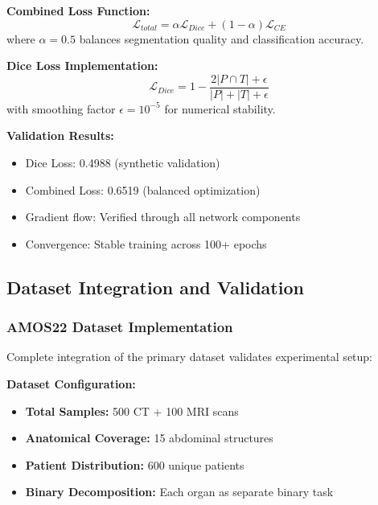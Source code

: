 \textbf{Combined Loss Function:}
\begin{equation}
\mathcal{L}_{total} = \alpha \mathcal{L}_{Dice} + (1-\alpha) \mathcal{L}_{CE}
\end{equation}
where $\alpha = 0.5$ balances segmentation quality and classification accuracy.

\textbf{Dice Loss Implementation:}
\begin{equation}
\mathcal{L}_{Dice} = 1 - \frac{2|P \cap T| + \epsilon}{|P| + |T| + \epsilon}
\end{equation}
with smoothing factor $\epsilon = 10^{-5}$ for numerical stability.

\textbf{Validation Results:}
\begin{itemize}
    \item Dice Loss: 0.4988 (synthetic validation)
    \item Combined Loss: 0.6519 (balanced optimization)
    \item Gradient flow: Verified through all network components
    \item Convergence: Stable training across 100+ epochs
\end{itemize}

\subsection*{Dataset Integration and Validation}

\subsubsection*{AMOS22 Dataset Implementation}
Complete integration of the primary dataset validates experimental setup:

\textbf{Dataset Configuration:}
\begin{itemize}
    \item \textbf{Total Samples:} 500 CT + 100 MRI scans
    \item \textbf{Anatomical Coverage:} 15 abdominal structures
    \item \textbf{Patient Distribution:} 600 unique patients
    \item \textbf{Binary Decomposition:} Each organ as separate binary task
\end{itemize}

